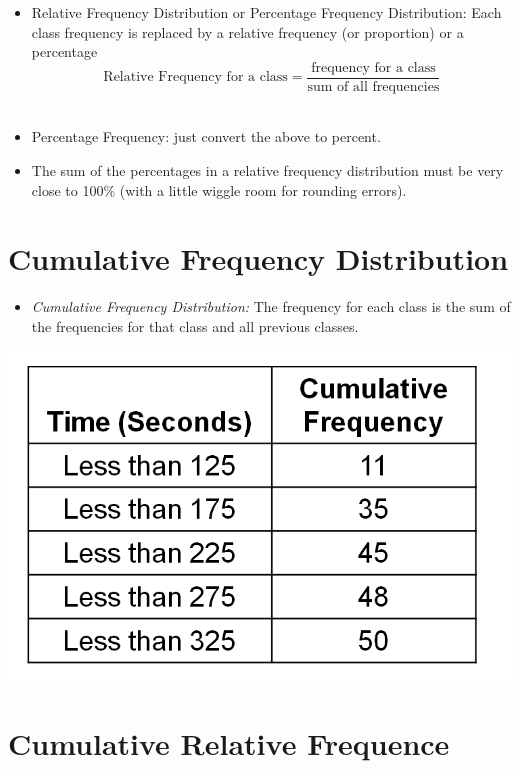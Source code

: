 \documentclass[]{book}
\providecommand{\tightlist}{%
  \setlength{\itemsep}{0pt}\setlength{\parskip}{0pt}}
\begin{document}
\begin{itemize}
\tightlist
\item
  Relative Frequency Distribution or Percentage Frequency Distribution: Each class frequency is replaced by a relative frequency (or proportion) or a percentage\\
  \[\textrm{Relative Frequency for a class}=\frac{\textrm{frequency for a class}}{\textrm{sum of all frequencies}}\]\\
\item
  Percentage Frequency: just convert the above to percent.
\item
  The sum of the percentages in a relative frequency distribution must be very close to 100\% (with a little wiggle room for rounding errors).
\end{itemize}

\hypertarget{cumulative-frequency-distribution}{%
\section{Cumulative Frequency Distribution}\label{cumulative-frequency-distribution}}

\begin{itemize}
\tightlist
\item
  \emph{Cumulative Frequency Distribution:} The frequency for each class is the sum of the frequencies for that class and all previous classes.
\end{itemize}

\includegraphics{Mcdonalds_cumul.png}

\hypertarget{cumulative-relative-frequence}{%
\section{Cumulative Relative Frequence}\label{cumulative-relative-frequence}}
\end{document}
